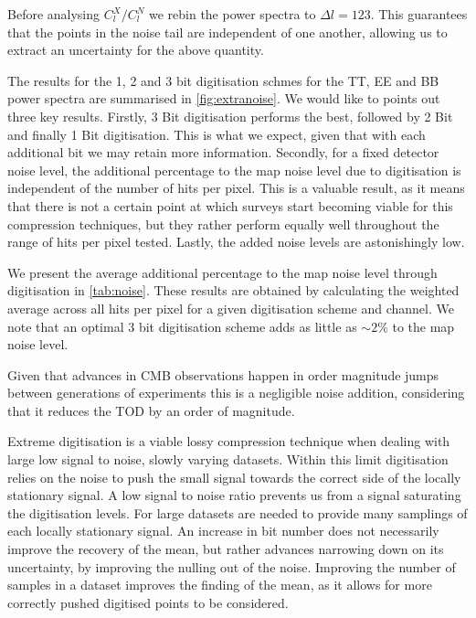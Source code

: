 \documentclass[apj]{emulateapj}
\begin{document}
Before analysing $C_l^X/C_l^N$ we rebin the power spectra to $\Delta l = 123$. This guarantees that the points in the noise tail are independent of one another, allowing us to extract an uncertainty for the above quantity.

The results for the 1, 2 and 3 bit digitisation schmes for the TT, EE and BB power spectra are summarised in \ref{fig:extranoise}. We would like to points out three key results. Firstly, 3 Bit digitisation performs the best, followed by 2 Bit and finally 1 Bit digitisation. This is what we expect, given that with each additional bit we may retain more information. Secondly, for a fixed detector noise level, the additional percentage to the map noise level due to digitisation is independent of the number of hits per pixel. This is a valuable result, as it means that there is not a certain point at which surveys start becoming viable for this compression techniques, but they rather perform equally well throughout the range of hits per pixel tested. Lastly, the added noise levels are astonishingly low.



We present the average additional percentage to the map noise level through digitisation in \ref{tab:noise}. These results are obtained by calculating the weighted average across all hits per pixel for a given digitisation scheme and channel. We note that an optimal 3 bit digitisation scheme adds as little as $\sim2\%$ to the map noise level.

Given that advances in CMB observations happen in order magnitude jumps between generations of experiments this is a negligible noise addition, considering that it reduces the TOD by an order of magnitude.

Extreme digitisation is a viable lossy compression technique when dealing with large low signal to noise, slowly varying datasets. Within this limit digitisation relies on the noise to push the small signal towards the correct side of the locally stationary signal. A low signal to noise ratio prevents us from a signal saturating the digitisation levels. For large datasets are needed to provide many samplings of each locally stationary signal. An increase in bit number does not necessarily improve the recovery of the mean, but rather advances narrowing down on its uncertainty, by improving the nulling out of the noise. Improving the number of samples in a dataset improves the finding of the mean, as it allows for more correctly pushed digitised points to be considered.
\end{document}
